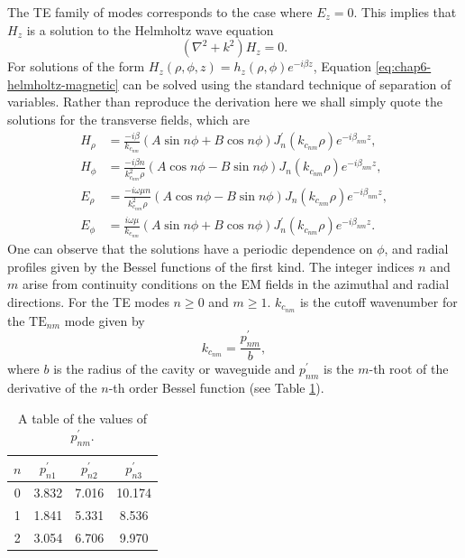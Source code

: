 The TE family of modes corresponds to the case where $E_z=0$. This implies that $H_z$ is a solution to the Helmholtz wave equation 
\begin{equation}
    (\nabla^2 + k^2)H_z = 0.
    \label{eq:chap6-helmholtz-magnetic}
\end{equation}
For solutions of the form $H_z(\rho,\phi,z)=h_z(\rho,\phi)e^{-i\beta z}$, Equation \ref{eq:chap6-helmholtz-magnetic} can be solved using the standard technique of separation of variables. Rather than reproduce the derivation here we shall simply quote the solutions for the transverse fields, which are 
\begin{align}
    H_\rho &= \frac{-i\beta }{k_{c_{nm}}}(A\sin{n\phi}+B\cos{n\phi})J_n^\prime(k_{c_{nm}}\rho)e^{-i\beta_{nm} z},\\
    H_\phi &=\frac{-i\beta n}{k_{c_{nm}}^2\rho}(A\cos{n\phi}-B\sin{n\phi})J_n(k_{c_{nm}}\rho)e^{-i\beta_{nm} z},\\
    E_\rho &=\frac{-i\omega\mu n}{k_{c_{nm}}^2 \rho}(A\cos{n\phi}-B\sin{n\phi})J_n(k_{c_{nm}}\rho)e^{-i\beta_{nm} z},\label{eq:chap6-erho-TE}\\
    E_\phi &=\frac{i\omega\mu}{k_{c_{nm}}}(A\sin{n\phi}+B\cos{n\phi})J_n^\prime(k_{c_{nm}}\rho)e^{-i\beta_{nm} z}\label{eq:chap6-ephi-TE}.
\end{align}
One can observe that the solutions have a periodic dependence on $\phi$, and radial profiles given by the Bessel functions of the first kind. The integer indices $n$ and $m$ arise from continuity conditions on the EM fields in the azimuthal and radial directions. For the TE modes $n\geq0$ and $m\geq1$. $k_{c_{nm}}$ is the cutoff wavenumber for the $\mathrm{TE}_{nm}$ mode given by 
\begin{equation}
    k_{c_{nm}} = \frac{p^\prime_{nm}}{b},
\end{equation}
where $b$ is the radius of the cavity or waveguide and $p^\prime_{nm}$ is the $m$-th root of the derivative of the $n$-th order Bessel function (see Table \ref{tab:chap6-bessel-derivative-roots}).

\begin{table}[htbp]
    \centering
    \caption{\label{tab:chap6-bessel-derivative-roots} A table of the values of $p_{nm}^\prime$.}
    \begin{tabular}{c c c c }
        \hline
        $n$ & $p_{n1}^\prime$ & $p_{n2}^\prime$ & $p_{n3}^\prime$ \\
        \hline
        0 & 3.832 & 7.016 & 10.174\\
        1 & 1.841 & 5.331 & 8.536\\
        2 & 3.054 & 6.706 & 9.970\\
        \hline
    \end{tabular}
\end{table}

